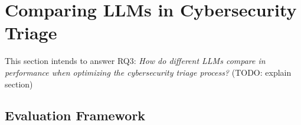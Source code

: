 \section{Comparing LLMs in Cybersecurity Triage}
\label{sec:rq3}

This section intends to answer RQ3:
\textit{How do different LLMs compare in performance when optimizing the cybersecurity triage process?}
(TODO: explain section) %

\subsection{Evaluation Framework}
\label{subsec:rq3-evaluation-framework}

